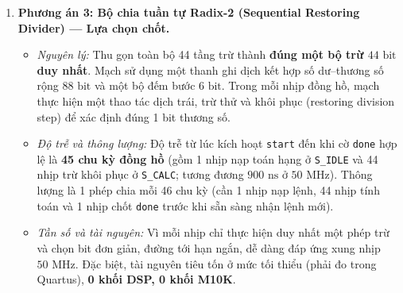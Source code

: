 \begin{enumerate}[leftmargin=1.5em, itemsep=4pt]
    \item \textbf{Phương án 3: Bộ chia tuần tự Radix-2 (Sequential Restoring Divider) --- Lựa chọn chốt.}
    \begin{itemize}[leftmargin=1.2em, itemsep=2pt]
        \item \emph{Nguyên lý:} Thu gọn toàn bộ 44 tầng trừ thành \textbf{đúng một bộ trừ $44\text{ bit}$ duy nhất}. Mạch sử dụng một thanh ghi dịch kết hợp số dư--thương số rộng $88\text{ bit}$ và một bộ đếm bước $6\text{ bit}$. Trong mỗi nhịp đồng hồ, mạch thực hiện một thao tác dịch trái, trừ thử và khôi phục (restoring division step) để xác định đúng 1 bit thương số.
        \item \emph{Độ trễ và thông lượng:} Độ trễ từ lúc kích hoạt \texttt{start} đến khi cờ \texttt{done} hợp lệ là \textbf{45 chu kỳ đồng hồ} (gồm 1 nhịp nạp toán hạng ở \texttt{S\_IDLE} và 44 nhịp trừ khôi phục ở \texttt{S\_CALC}; tương đương $900\text{ ns}$ ở $50\text{ MHz}$). Thông lượng là 1 phép chia mỗi 46 chu kỳ (cần 1 nhịp nạp lệnh, 44 nhịp tính toán và 1 nhịp chốt \texttt{done} trước khi sẵn sàng nhận lệnh mới).
        \item \emph{Tần số và tài nguyên:} Vì mỗi nhịp chỉ thực hiện duy nhất một phép trừ và chọn bit đơn giản, đường tới hạn ngắn, dễ dàng đáp ứng xung nhịp $50\text{ MHz}$. Đặc biệt, tài nguyên tiêu tốn ở mức tối thiểu (phải đo trong Quartus), \textbf{0 khối DSP, 0 khối M10K}.
    \end{itemize}
\end{enumerate}

